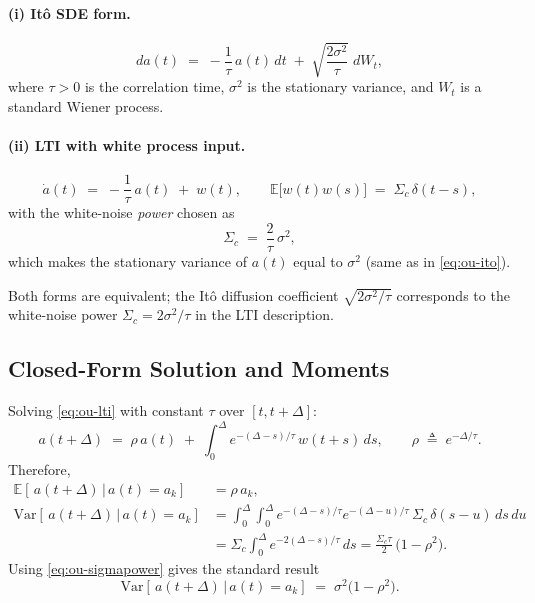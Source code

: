 \documentclass[10pt]{extarticle}
\begin{document}
\paragraph{(i) It\^o SDE form.}
\begin{equation}
da(t) \;=\; -\frac{1}{\tau}\,a(t)\,dt \;+\; \sqrt{\frac{2\sigma^2}{\tau}}\; dW_t,
\label{eq:ou-ito}
\end{equation}
where $\tau>0$ is the correlation time, $\sigma^2$ is the stationary variance, and $W_t$
is a standard Wiener process.

\paragraph{(ii) LTI with white process input.}
\begin{equation}
\dot a(t) \;=\; -\frac{1}{\tau}\,a(t) \;+\; w(t),\qquad
\mathbb{E}\big[w(t)w(s)\big] \;=\; \Sigma_c\,\delta(t-s),
\label{eq:ou-lti}
\end{equation}
with the white-noise \emph{power} chosen as
\begin{equation}
\Sigma_c \;=\; \frac{2}{\tau}\,\sigma^2,
\label{eq:ou-sigmapower}
\end{equation}
which makes the stationary variance of $a(t)$ equal to $\sigma^2$ (same as in \eqref{eq:ou-ito}).

Both forms are equivalent; the It\^o diffusion coefficient $\sqrt{2\sigma^2/\tau}$ corresponds to
the white-noise power $\Sigma_c = 2\sigma^2/\tau$ in the LTI description.

\subsection{Closed-Form Solution and Moments}
Solving \eqref{eq:ou-lti} with constant $\tau$ over $[t,t+\Delta]$:
\begin{equation}
a(t+\Delta) \;=\; \rho\,a(t) \;+\; \int_0^\Delta e^{-(\Delta-s)/\tau}\,w(t+s)\,ds,
\qquad
\rho \;\triangleq\; e^{-\Delta/\tau}.
\label{eq:ou-sol}
\end{equation}
Therefore,
\begin{align}
\mathbb{E}[\,a(t+\Delta)\,|\,a(t)=a_k] &= \rho\,a_k, \label{eq:ou-mean}\\
\mathrm{Var}[\,a(t+\Delta)\,|\,a(t)=a_k] 
&= \int_0^\Delta\!\!\int_0^\Delta e^{-(\Delta-s)/\tau}e^{-(\Delta-u)/\tau}\,\Sigma_c\,\delta(s-u)\,ds\,du
\nonumber\\
&= \Sigma_c \int_0^\Delta e^{-2(\Delta-s)/\tau}\,ds
= \frac{\Sigma_c\tau}{2}\,\big(1-\rho^2\big).
\end{align}
Using \eqref{eq:ou-sigmapower} gives the standard result
\begin{equation}
\mathrm{Var}[\,a(t+\Delta)\,|\,a(t)=a_k] \;=\; \sigma^2\big(1-\rho^2\big).
\label{eq:ou-var-step}
\end{equation}
\end{document}
